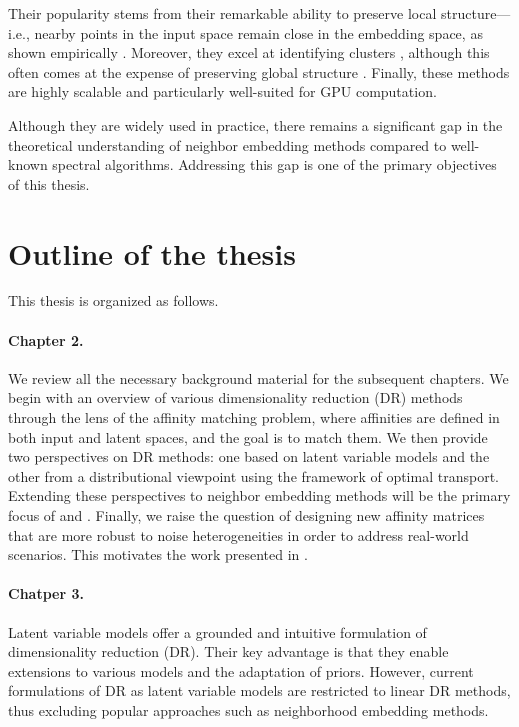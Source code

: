 Their popularity stems from their remarkable ability to preserve local structure—i.e., nearby points in the input space remain close in the embedding space, as shown empirically \citep{wang2021understanding}. Moreover, they excel at identifying clusters \citep{arora2018analysis, linderman2019clustering}, although this often comes at the expense of preserving global structure \citep{wattenberg2016use, coenen2019understanding}. Finally, these methods are highly scalable and particularly well-suited for GPU computation.


Although they are widely used in practice, there remains a significant gap in the theoretical understanding of neighbor embedding methods compared to well-known spectral algorithms. Addressing this gap is one of the primary objectives of this thesis.


\section{Outline of the thesis}

This thesis is organized as follows.

\paragraph{Chapter 2.}
We review all the necessary background material for the subsequent chapters. We begin with an overview of various dimensionality reduction (DR) methods through the lens of the affinity matching problem, where affinities are defined in both input and latent spaces, and the goal is to match them. We then provide two perspectives on DR methods: one based on latent variable models and the other from a distributional viewpoint using the framework of optimal transport. Extending these perspectives to neighbor embedding methods will be the primary focus of  and . Finally, we raise the question of designing new affinity matrices that are more robust to noise heterogeneities in order to address real-world scenarios. This motivates the work presented in .

\paragraph{Chatper 3.} 
Latent variable models offer a grounded and intuitive formulation of dimensionality reduction (DR). Their key advantage is that they enable extensions to various models and the adaptation of priors. However, current formulations of DR as latent variable models are restricted to linear DR methods, thus excluding popular approaches such as neighborhood embedding methods. 

